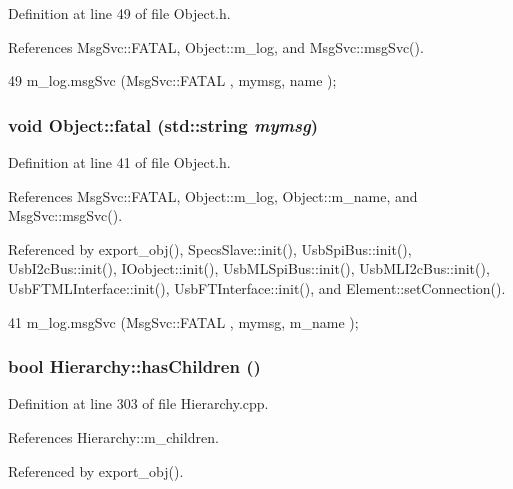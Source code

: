Definition at line 49 of file Object.h.

References MsgSvc::FATAL, Object::m\_\-log, and MsgSvc::msgSvc().


\begin{DoxyCode}
49 { m_log.msgSvc (MsgSvc::FATAL   , mymsg, name ); }
\end{DoxyCode}
\hypertarget{classObject_aad5a16aac7516ce65bd5ec02ab07fc80}{
\subsubsection[{fatal}]{\setlength{\rightskip}{0pt plus 5cm}void Object::fatal (std::string {\em mymsg})}}
\label{classObject_aad5a16aac7516ce65bd5ec02ab07fc80}


Definition at line 41 of file Object.h.

References MsgSvc::FATAL, Object::m\_\-log, Object::m\_\-name, and MsgSvc::msgSvc().

Referenced by export\_\-obj(), SpecsSlave::init(), UsbSpiBus::init(), UsbI2cBus::init(), IOobject::init(), UsbMLSpiBus::init(), UsbMLI2cBus::init(), UsbFTMLInterface::init(), UsbFTInterface::init(), and Element::setConnection().


\begin{DoxyCode}
41 { m_log.msgSvc (MsgSvc::FATAL   , mymsg, m_name ); }
\end{DoxyCode}
\hypertarget{classHierarchy_a255174fe4d316d2a3f430dcb9dab29f1}{
\subsubsection[{hasChildren}]{\setlength{\rightskip}{0pt plus 5cm}bool Hierarchy::hasChildren ()}}
\label{classHierarchy_a255174fe4d316d2a3f430dcb9dab29f1}


Definition at line 303 of file Hierarchy.cpp.

References Hierarchy::m\_\-children.

Referenced by export\_\-obj().


